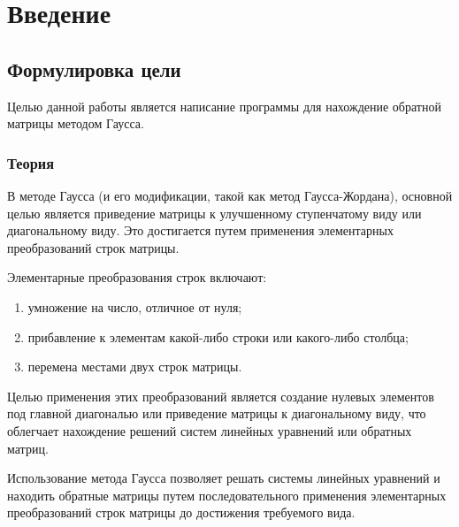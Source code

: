 \documentclass[12pt,a4paper]{scrartcl}
\begin{document}
\section{Введение}
\label{sec:intro}


\subsection{Формулировка цели}
Целью данной работы является написание программы для нахождение обратной матрицы методом Гаусса.

\subsubsection{Теория}
В методе Гаусса (и его модификации, такой как метод Гаусса-Жордана), основной целью является приведение матрицы к улучшенному ступенчатому виду или диагональному виду. Это достигается путем применения элементарных преобразований строк матрицы.

Элементарные преобразования строк включают:
    \begin{enumerate}
        \item умножение на число, отличное от нуля;
        \item прибавление к элементам какой-либо строки или какого-либо столбца;
        \item перемена местами двух строк матрицы.
    \end{enumerate}
    \noindent 

Целью применения этих преобразований является создание нулевых элементов под главной диагональю или приведение матрицы к диагональному виду, что облегчает нахождение решений систем линейных уравнений или обратных матриц.

Использование метода Гаусса позволяет решать системы линейных уравнений и находить обратные матрицы путем последовательного применения элементарных преобразований строк матрицы до достижения требуемого вида.
\end{document}
